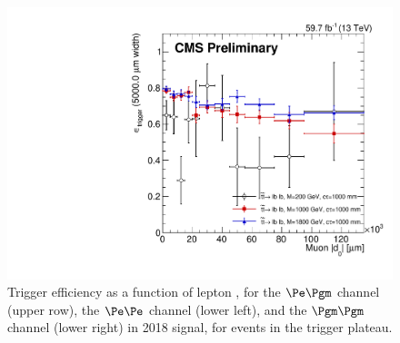 \begin{figure}
\includegraphics[scale=0.3]{figures/systematics/trig_eff/mumu_2018/muonAbsD0_100000um_variableBins_coarse.pdf}
\caption{Trigger efficiency as a function of lepton \ad, for the $\Pe\Pgm$ channel (upper row), the $\Pe\Pe$ channel (lower left), and the $\Pgm\Pgm$ channel (lower right) in 2018 signal, for events in the trigger \pt plateau.}
\label{trig_eff_d0}
\end{figure}